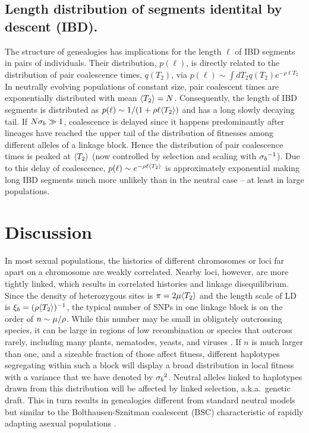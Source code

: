 \subsection*{Length distribution of segments identital by descent (IBD).}
The structure of genealogies has implications for the length $\ell$ of
IBD segments in pairs of individuals. Their
distribution, $p(\ell )$, is directly related to the distribution of
pair coalescence times, $q(T_2 )$, via $p(\ell ) \sim \int dT_2 q(T_2 )
e^{-\rho \ell T_2} $ In neutrally evolving populations of constant size,
pair coalescent times are exponentially distributed with mean
$\langle T_2\rangle=N$. Consequently, the length of IBD segments is distributed as
$p(\ell) \sim 1/(1+\rho \ell \langle T_2\rangle)$ and has a long slowly decaying
tail.  If $N{\sigma_b}\gg 1$, coalescence is delayed since it happens predominantly after
lineages have reached the upper tail of the distribution of fitnesses
among different alleles of a linkage block. Hence the distribution of
pair coalescence times is peaked at $\langle T_2\rangle$ (now controlled by
selection and scaling with ${\sigma_b}^{-1}$).  Due to this delay of
coalescence, $p(\ell ) \sim e^{-\rho \ell \langle T_2\rangle}$ is approximately
exponential making long IBD segments much more unlikely than in the
neutral case -- at least in large populations.


\section{Discussion}
In most sexual populations, the histories of different chromosomes or
loci far apart on a chromosome are weakly correlated. Nearby loci,
however, are more tightly linked, which results in correlated histories
and linkage disequilibrium. Since the density of heterozygous sites
is $\pi = 2\mu \langle T_2\rangle$ and the length scale of LD is ${\xi_b} = (\rho
\langle T_2\rangle)^{-1}$, the typical number of SNPs in one linkage block is on the
order of $n \sim \mu/\rho$. While this number may be small in obligately
outcrossing species, it can be large in regions of low recombination or
species that outcross rarely, including many plants, nematodes, yeasts,
and viruses
\cite{bomblies_local-scale_2010,barriere_high_2005,Neher:2010p32691,tsai_population_2008}.
If $n$ is much larger than one, and
a sizeable fraction of those affect fitness, different haplotypes
segregating within such a block will display a broad distribution in
local fitness with a variance that we have denoted by
${\sigma_b}^2$. Neutral alleles linked to haplotypes drawn from this
distribution will be affected by linked selection, a.k.a.~genetic
draft. This in turn results in genealogies different from standard
neutral models but similar to the Bolthausen-Sznitman coalescent (BSC)
characteristic of rapidly adapting asexual populations
\cite{neher_genealogies_2012,Neher:2011p42539}. 

